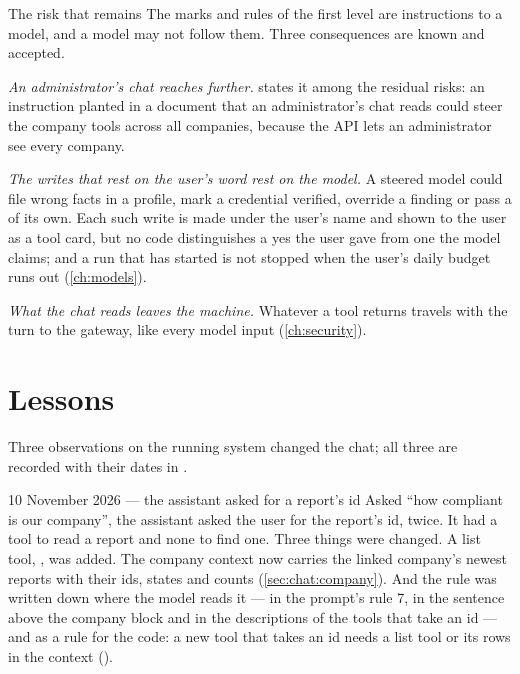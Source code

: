 \begin{notebox}{The risk that remains}
The marks and rules of the first level are instructions to a model, and a model may not follow
them. Three consequences are known and accepted.

\emph{An administrator's chat reaches further.}  states it among
the residual risks: an instruction planted in a document that an administrator's chat reads
could steer the company tools across all companies, because the API lets an administrator see
every company.

\emph{The writes that rest on the user's word rest on the model.} A steered model could file
wrong facts in a profile, mark a credential verified, override a finding or pass a
 of its own.
Each such write is made under the user's name and shown to the user as a tool card, but no
code distinguishes a yes the user gave from one the model claims; and a run that has started
is not stopped when the user's daily budget runs out (\cref{ch:models}).

\emph{What the chat reads leaves the machine.} Whatever a tool returns travels with the turn to
the gateway, like every model input (\cref{ch:security}).
\end{notebox}


\section{Lessons}\label{sec:chat:lessons}

Three observations on the running system changed the chat; all three are recorded with their
dates in .

\begin{lessonbox}{10 November 2026 --- the assistant asked for a report's id}
Asked \enquote{how compliant is our company}, the assistant asked the user for the report's
id, twice. It had a tool to read a report and none to find one. Three things were changed. A
list tool, , was added. The company context now carries the linked company's
newest reports with their ids, states and counts (\cref{sec:chat:company}). And the rule was
written down where the model reads it --- in the prompt's rule 7, in the sentence above the
company block and in the descriptions of the tools that take an id --- and as a rule for the
code: a new tool that takes an id needs a list tool or its rows in the context
().
\end{lessonbox}

